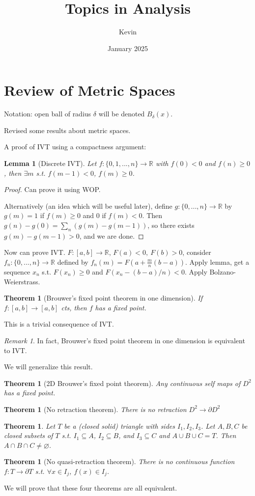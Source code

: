 \documentclass{article}
\title{Topics in Analysis}
\author{Kevin}
\date{January 2025}
\theoremstyle{definition}
\theoremstyle{remark}
\newtheorem{rem}{Remark}
\theoremstyle{plain}
\newtheorem{lem}[defn]{Lemma}
\newtheorem{thm}[defn]{Theorem}
\newcommand{\RR}{\mathbb{R}}
\begin{document}
\maketitle
\section{Review of Metric Spaces}
Notation: open ball of radius $\delta$ will be denoted $B_\delta(x)$.

Revised some results about metric spaces.

A proof of IVT using a compactness argument:
\begin{lem}[Discrete IVT]
    Let $f:\{0,1,...,n\}\to\RR$ with $f(0)<0$ and $f(n)\ge 0$, then $\exists m$ s.t. $f(m-1)<0$, $f(m)\ge 0$.
\end{lem}
\begin{proof}
    Can prove it using WOP.

    Alternatively (an idea which will be useful later), define $g:\{0,...,n\}\to\RR$ by $g(m)=1$ if $f(m)\ge 0$ and $0$ if $f(m)<0$. Then $g(n)-g(0)=\sum_n(g(m)-g(m-1))$, so there exists $g(m)-g(m-1)>0$, and we are done. 
\end{proof}
Now can prove IVT. $F:[a,b]\to\RR$, $F(a)<0,\ F(b)>0$, consider $f_n:\{0,...,n\}\to\RR$ defined by $f_n(m)=F(a+\frac{m}{n}(b-a))$. Apply lemma, get a sequence $x_n$ s.t. $F(x_n)\ge 0$ and $F(x_n-(b-a)/n)<0$. Apply Bolzano-Weierstrass.

\begin{thm}[Brouwer's fixed point theorem in one dimension]
    If $f:[a,b]\to[a,b]$ cts, then $f$ has a fixed point.
\end{thm}
This is a trivial consequence of IVT.

\begin{rem}
    In fact, Brouwer's fixed point theorem in one dimension is equivalent to IVT.
\end{rem}

We will generalize this result.

\begin{thm}[2D Brouwer's fixed point theorem]
    Any continuous self maps of $D^2$ has a fixed point.
\end{thm}
\begin{thm}[No retraction theorem]
    There is no retraction $D^2\to \partial D^2$
\end{thm}
\begin{thm}
    Let $T$ be a (closed solid) triangle with sides $I_1,I_2,I_3$. Let $A,B,C$ be closed subsets of $T$ s.t. $I_1\subseteq A$, $I_2\subseteq B$, and $I_3\subseteq C$ and $A\cup B\cup C=T$. Then $A\cap B\cap C\neq\varnothing$.
\end{thm}
\begin{thm}[No quasi-retraction theorem]
    There is no continuous function $f:T\to\partial T$ s.t. $\forall x\in I_j$, $f(x)\in I_j$.
\end{thm}

We will prove that these four theorems are all equivalent.
\end{document}
